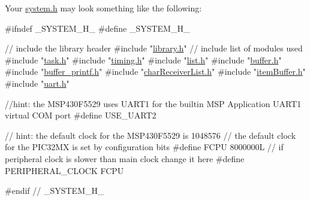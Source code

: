 Your \hyperlink{system_8h}{system.\+h} may look something like the following\+: 
\begin{DoxyCode}
\textcolor{preprocessor}{#ifndef \_SYSTEM\_H\_}
\textcolor{preprocessor}{#define \_SYSTEM\_H\_}

\textcolor{comment}{// include the library header}
\textcolor{preprocessor}{#include "\hyperlink{library_8h}{library.h}"}
\textcolor{comment}{// include list of modules used}
\textcolor{preprocessor}{#include "\hyperlink{task_8h}{task.h}"}
\textcolor{preprocessor}{#include "\hyperlink{timing_8h}{timing.h}"}
\textcolor{preprocessor}{#include "\hyperlink{list_8h}{list.h}"}
\textcolor{preprocessor}{#include "\hyperlink{buffer_8h}{buffer.h}"}
\textcolor{preprocessor}{#include "\hyperlink{buffer__printf_8h}{buffer\_printf.h}"}
\textcolor{preprocessor}{#include "\hyperlink{char_receiver_list_8h}{charReceiverList.h}"}
\textcolor{preprocessor}{#include "\hyperlink{item_buffer_8h}{itemBuffer.h}"}
\textcolor{preprocessor}{#include "\hyperlink{uart_8h}{uart.h}"}

\textcolor{comment}{//hint: the MSP430F5529 uses UART1 for the builtin MSP Application UART1 virtual COM port}
\textcolor{preprocessor}{#define USE\_UART2}

\textcolor{comment}{// hint: the default clock for the MSP430F5529 is 1048576}
\textcolor{comment}{// the default clock for the PIC32MX is set by configuration bits}
\textcolor{preprocessor}{#define FCPU     8000000L}
\textcolor{comment}{// if peripheral clock is slower than main clock change it here}
\textcolor{preprocessor}{#define PERIPHERAL\_CLOCK FCPU}

\textcolor{preprocessor}{#endif // \_SYSTEM\_H\_}
\end{DoxyCode}


